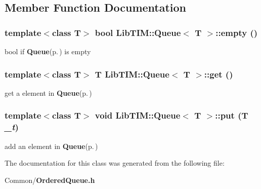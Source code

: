 \subsection{Member Function Documentation}
\subsubsection{\setlength{\rightskip}{0pt plus 5cm}template$<$class T$>$ bool {\bf Lib\-TIM::Queue}$<$ T $>$::empty ()\hspace{0.3cm}{\tt  [inline]}}\label{classLibTIM_1_1Queue_a3}


bool if {\bf Queue}{\rm (p.\,\pageref{classLibTIM_1_1Queue})} is empty 

\subsubsection{\setlength{\rightskip}{0pt plus 5cm}template$<$class T$>$ T {\bf Lib\-TIM::Queue}$<$ T $>$::get ()\hspace{0.3cm}{\tt  [inline]}}\label{classLibTIM_1_1Queue_a2}


get a element in {\bf Queue}{\rm (p.\,\pageref{classLibTIM_1_1Queue})} 

\subsubsection{\setlength{\rightskip}{0pt plus 5cm}template$<$class T$>$ void {\bf Lib\-TIM::Queue}$<$ T $>$::put (T {\em \_\-t})\hspace{0.3cm}{\tt  [inline]}}\label{classLibTIM_1_1Queue_a1}


add an element in {\bf Queue}{\rm (p.\,\pageref{classLibTIM_1_1Queue})} 



The documentation for this class was generated from the following file:\begin{CompactItemize}
\item 
Common/{\bf Ordered\-Queue.h}\end{CompactItemize}
